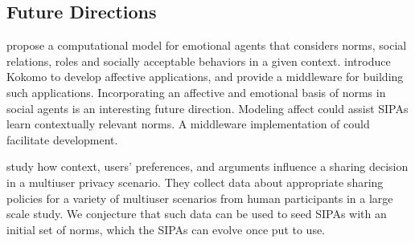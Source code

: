 \subsection*{Future Directions}

\citet{Ferreira-AAAI13-GroupRelations} propose a
computational model for emotional agents that considers norms, social
relations, roles and socially acceptable behaviors in a given context.
\citet{Sollenberger-AAMAS11-Kokomo} introduce Kokomo 
to develop affective applications, and provide a middleware for building 
such applications. 
Incorporating an affective \citep{Sollenberger-AAMAS11-Kokomo} and emotional
basis of norms in social agents is an interesting future direction.
Modeling affect could assist SIPAs learn contextually relevant norms. 
A middleware implementation of \frameworkA could facilitate development.

\citet{TOCHI-17:Multiuser} study how context, users' preferences, 
and arguments influence a sharing decision in a multiuser privacy scenario. 
They collect data about appropriate sharing policies for a variety of multiuser
scenarios from human participants in a large scale study. We conjecture that 
such data can be used to seed SIPAs with an initial set of norms, which the 
SIPAs can evolve once put to use.
